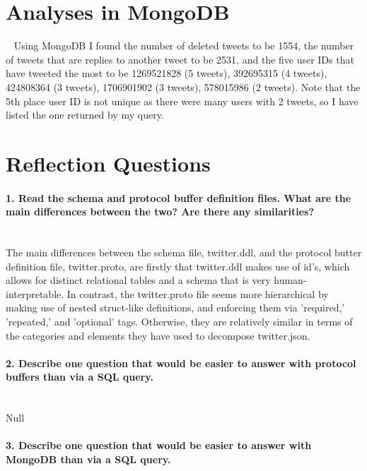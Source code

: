 \documentclass[12pt]{article}
\let\oldsection\section
\renewcommand\section{\clearpage\oldsection}
\begin{document}


\section{Analyses in MongoDB} ~
Using MongoDB I found the number of deleted tweets to be 1554, the number of tweets that are replies to another tweet to be 2531, and the five user IDs that have tweeted the most to be 1269521828 (5 tweets), 392695315 (4 tweets), 424808364 (3 tweets), 1706901902 (3 tweets), 578015986 (2 tweets). Note that the 5th place user ID is not unique as there were many users with 2 tweets, so I have listed the one returned by my query.



\section*{Reflection Questions}

\paragraph{1. Read the schema and protocol buffer definition files. What are the main differences between the two? Are there any similarities?}\mbox{}\\ 

The main differences between the schema file, twitter.ddl, and the protocol butter definition file, twitter.proto, are firstly that twitter.ddl makes use of id's, which allows for distinct relational tables and a schema that is very human-interpretable. In contrast, the twitter.proto file seems more hierarchical by making use of nested struct-like definitions, and enforcing them via 'required,' 'repeated,' and 'optional' tags. Otherwise, they are relatively similar in terms of the categories and elements they have used to decompose twitter.json.

\paragraph{2. Describe one question that would be easier to answer with protocol buffers than via a SQL query.}\mbox{}\\

Null

\paragraph{3. Describe one question that would be easier to answer with MongoDB than via a SQL query.}\mbox{}\\
\end{document}
